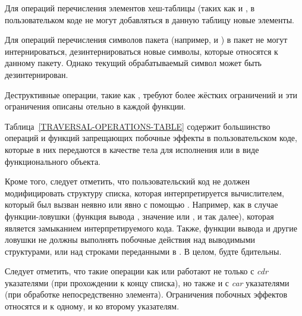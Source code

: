 Для операций перечисления элементов хеш-таблицы (таких как
 и , в пользовательком коде не могут
добавляться в данную таблицу новые элементы.

Для операций перечисления символов пакета (например, 
и ) в пакет не могут интернироваться, дезинтернироваться новые
символы, которые относятся к данному пакету. Однако текущий обрабатываемый
символ может быть дезинтернирован.

Деструктивные операции, такие как , требуют более жёстких
ограничений и эти ограничения описаны отельно в каждой функции.

Таблица~\ref{TRAVERSAL-OPERATIONS-TABLE} содержит большинство операций и функций
запрещающих побочные эффекты в пользовательском коде, которые в них передаются в
качестве тела для исполнения или в виде функционального объекта.

Кроме того, следует отметить, что пользовательский код не должен модифицировать
структуру списка, которая интерпретируется вычислителем, который был вызван
неявно или явно с помощью . Например, как в случае функции-ловушки
(функция вывода , значение  или
, и так далее), которая является замыканием интерпретируемого
кода.
Также, функции вывода  и другие ловушки не должны выполнять
побочные действия над выводимыми структурами, или над строками переданными в
. В целом, будте бдительны.

Следует отметить, что такие операции как  или  работают
не только с \emph{cdr} указателями (при прохождении к концу списка), но также и
с \emph{car} указателями (при обработке непосредственно элемента). Ограничения
побочных эффектов относятся и к одному, и ко второму указателям.

